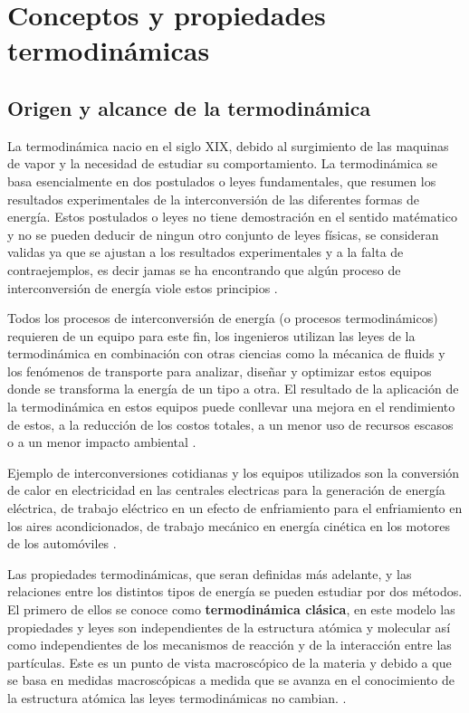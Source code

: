 \documentclass[master.tex]{subfiles}
\begin{document}
\section{Conceptos y propiedades termodinámicas}

\subsection{Origen y alcance de la termodinámica}

    La termodinámica nacio en el siglo XIX, debido al surgimiento de las maquinas de vapor y la necesidad de estudiar su comportamiento. La termodinámica se basa esencialmente en dos postulados o leyes fundamentales, que resumen los resultados experimentales de la interconversión de las diferentes formas de energía. Estos postulados o leyes no tiene demostración en el sentido matématico y no se pueden deducir de ningun otro conjunto de leyes físicas, se consideran validas ya que se ajustan a los resultados experimentales y a la falta de contraejemplos, es decir jamas se ha encontrando que algún proceso de interconversión de energía viole estos principios \parencites{glasstone}{smith-vanness}. 
    
    Todos los procesos de interconversión de energía (o procesos termodinámicos) requieren de un equipo para este fin, los ingenieros utilizan las leyes de la termodinámica en combinación con otras ciencias como la mécanica de fluids y los fenómenos de transporte para analizar, diseñar y optimizar estos equipos donde se transforma la energía de un tipo a otra. El resultado de la aplicación de la termodinámica en estos equipos puede conllevar una mejora en el rendimiento de estos, a la reducción de los costos totales, a un menor uso de recursos escasos o a un menor impacto ambiental \parencites{wark}{moranshapiro}.
    
    Ejemplo de interconversiones cotidianas y los equipos utilizados son la conversión de calor en electricidad en las centrales electricas para la generación de energía eléctrica, de trabajo eléctrico en un efecto de enfriamiento para el enfriamiento en los aires acondicionados, de trabajo mecánico en energía cinética en los motores de los automóviles \parencite{faires}.

    Las propiedades termodinámicas, que seran definidas más adelante, y las relaciones entre los distintos tipos de energía se pueden estudiar por dos métodos. El primero de ellos se conoce como \textbf{termodinámica clásica}, en este modelo las propiedades y leyes son independientes de la estructura atómica y molecular así como independientes de los mecanismos de reacción y de la interacción entre las partículas. Este es un punto de vista macroscópico de la materia y debido a que se basa en medidas macroscópicas a medida que se avanza en el conocimiento de la estructura atómica las leyes termodinámicas no cambian. \parencites{faires}{glasstone}{wark}.
\end{document}
